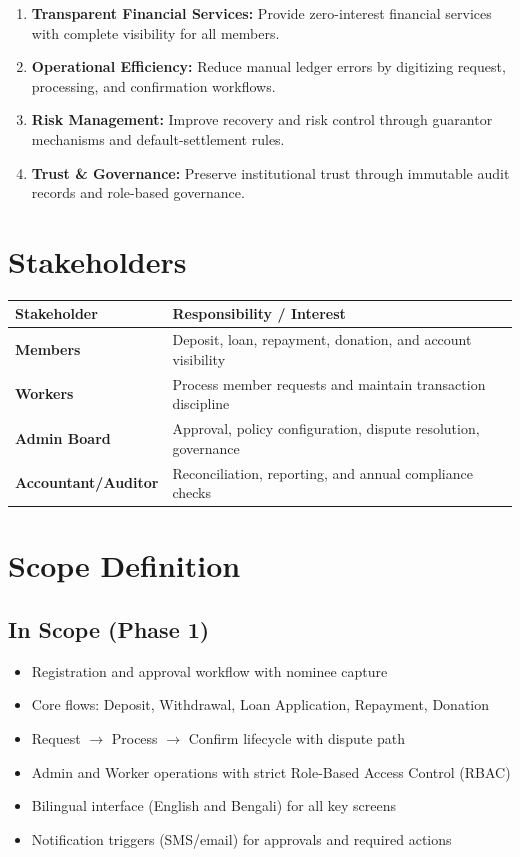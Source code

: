 \documentclass[11pt,a4paper]{article}
\begin{document}
\begin{enumerate}
    \item \textbf{Transparent Financial Services:} Provide zero-interest financial services with complete visibility for all members.
    \item \textbf{Operational Efficiency:} Reduce manual ledger errors by digitizing request, processing, and confirmation workflows.
    \item \textbf{Risk Management:} Improve recovery and risk control through guarantor mechanisms and default-settlement rules.
    \item \textbf{Trust \& Governance:} Preserve institutional trust through immutable audit records and role-based governance.
\end{enumerate}

\section{Stakeholders}

\begin{longtable}{@{}>{\bfseries}p{}p{}@{}}
\toprule
\textbf{Stakeholder} & \textbf{Responsibility / Interest} \\
\midrule
\endhead
Members & Deposit, loan, repayment, donation, and account visibility \\
\addlinespace
Workers & Process member requests and maintain transaction discipline \\
\addlinespace
Admin Board & Approval, policy configuration, dispute resolution, governance \\
\addlinespace
Accountant/Auditor & Reconciliation, reporting, and annual compliance checks \\
\bottomrule
\end{longtable}

\section{Scope Definition}

\subsection{In Scope (Phase 1)}

\begin{itemize}
    \item Registration and approval workflow with nominee capture
    \item Core flows: Deposit, Withdrawal, Loan Application, Repayment, Donation
    \item Request $\rightarrow$ Process $\rightarrow$ Confirm lifecycle with dispute path
    \item Admin and Worker operations with strict Role-Based Access Control (RBAC)
    \item Bilingual interface (English and Bengali) for all key screens
    \item Notification triggers (SMS/email) for approvals and required actions
\end{itemize}
\end{document}

